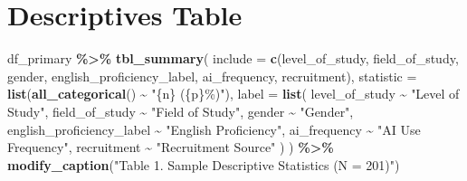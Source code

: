 \documentclass[
]{article}
\newenvironment{Shaded}{\begin{snugshade}}{\end{snugshade}}
\newcommand{\AttributeTok}[1]{\textcolor[rgb]{0.13,0.29,0.53}{#1}}
\newcommand{\FunctionTok}[1]{\textcolor[rgb]{0.13,0.29,0.53}{\textbf{#1}}}
\newcommand{\NormalTok}[1]{#1}
\newcommand{\SpecialCharTok}[1]{\textcolor[rgb]{0.81,0.36,0.00}{\textbf{#1}}}
\newcommand{\StringTok}[1]{\textcolor[rgb]{0.31,0.60,0.02}{#1}}
\begin{document}
\section{Descriptives Table}\label{descriptives-table}

\begin{Shaded}
\begin{Highlighting}[]
\NormalTok{df\_primary }\SpecialCharTok{\%\textgreater{}\%}
  \FunctionTok{tbl\_summary}\NormalTok{(}
    \AttributeTok{include =} \FunctionTok{c}\NormalTok{(level\_of\_study, field\_of\_study, gender,}
\NormalTok{                english\_proficiency\_label, ai\_frequency, recruitment),}
    \AttributeTok{statistic =} \FunctionTok{list}\NormalTok{(}\FunctionTok{all\_categorical}\NormalTok{() }\SpecialCharTok{\textasciitilde{}} \StringTok{"\{n\} (\{p\}\%)"}\NormalTok{),}
    \AttributeTok{label =} \FunctionTok{list}\NormalTok{(}
\NormalTok{      level\_of\_study            }\SpecialCharTok{\textasciitilde{}} \StringTok{"Level of Study"}\NormalTok{,}
\NormalTok{      field\_of\_study            }\SpecialCharTok{\textasciitilde{}} \StringTok{"Field of Study"}\NormalTok{,}
\NormalTok{      gender                    }\SpecialCharTok{\textasciitilde{}} \StringTok{"Gender"}\NormalTok{,}
\NormalTok{      english\_proficiency\_label }\SpecialCharTok{\textasciitilde{}} \StringTok{"English Proficiency"}\NormalTok{,}
\NormalTok{      ai\_frequency              }\SpecialCharTok{\textasciitilde{}} \StringTok{"AI Use Frequency"}\NormalTok{,}
\NormalTok{      recruitment               }\SpecialCharTok{\textasciitilde{}} \StringTok{"Recruitment Source"}
\NormalTok{    )}
\NormalTok{  ) }\SpecialCharTok{\%\textgreater{}\%}
  \FunctionTok{modify\_caption}\NormalTok{(}\StringTok{"Table 1. Sample Descriptive Statistics (N = 201)"}\NormalTok{)}
\end{Highlighting}
\end{Shaded}
\end{document}
